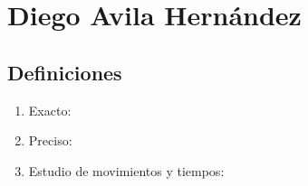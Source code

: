 \section{Diego Avila Hernández}
\subsection{Definiciones}

\begin{enumerate}
    \item Exacto:
    \item Preciso:
    \item Estudio de movimientos y tiempos:
\end{enumerate}